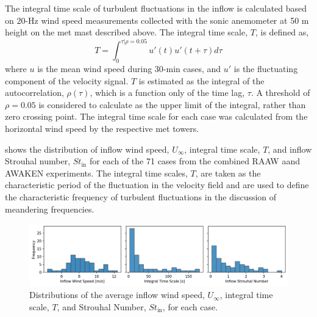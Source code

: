 \documentclass[%
 aip,
 amsmath,
 amssymb,
preprint,%
]{revtex4-2}
\begin{document}
The integral time scale of turbulent fluctuations in the inflow is calculated based on 20-Hz wind speed measurements collected with the sonic anemometer at 50 m height on the met mast described above. The integral time scale, $T$, is defined as,
\begin{equation}
T=\int_{0}^{\tau|\rho=0.05}u'(t)u'(t+\tau)d\tau
\label{Lscale}
\end{equation}
where $u$ is the mean wind speed during 30-min cases, and $u'$ is the fluctuating component of the velocity signal. $T$ is estimated as the integral of the autocorrelation, $\rho(\tau)$, which is a function only of the time lag, $\tau$. 
A threshold of $\rho = 0.05$ is considered to calculate as the upper limit of the integral, rather than zero crossing point.\cite{Simley2015, Debnath2020}
The integral time scale for each case was calculated from the horizontal wind speed by the respective met towers. 

 shows the distribution of inflow wind speed, $U_\infty$, integral time scale, $T$, and inflow Strouhal number, $St_\text{in}$ for each of the 71 cases from the combined RAAW aand AWAKEN experiments.
The integral time scales, $T$, are taken as the characteristic period of the fluctuation in the velocity field and are used to define the characteristic frequency of turbulent fluctuations in the discussion of meandering frequencies. 

\begin{figure}[h]
    \centering
    \includegraphics[width=\textwidth]{figs/inflow_WS_TS_ST_20240924.png}
    \caption{Distributions of the average inflow wind speed, $U_\infty$, integral time scale, $T$, and Strouhal Number, $St_\text{in}$, for each case. }
    \label{fig:ts}
\end{figure}


\end{document}
